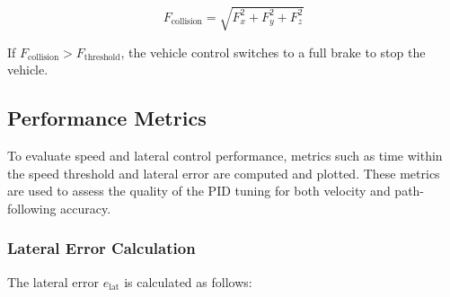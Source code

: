 \documentclass[conference]{IEEEtran}
\begin{document}
\begin{equation}
F_{\text{collision}} = \sqrt{F_x^2 + F_y^2 + F_z^2}
\end{equation}

If $F_{\text{collision}} > F_{\text{threshold}}$, the vehicle control switches to a full brake to stop the vehicle.

\subsection{Performance Metrics}
To evaluate speed and lateral control performance, metrics such as time within the speed threshold and lateral error are computed and plotted. These metrics are used to assess the quality of the PID tuning for both velocity and path-following accuracy.

\subsubsection{Lateral Error Calculation}

The lateral error $e_{\text{lat}}$ is calculated as follows:
\end{document}
